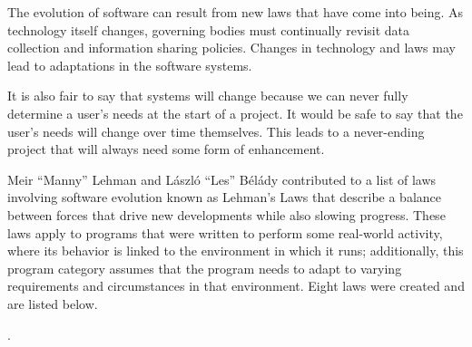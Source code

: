 The evolution of software can result from new laws that have come into being. As technology itself changes, governing bodies must continually revisit data collection and information sharing policies. Changes in technology and laws may lead to adaptations in the software systems.

It is also fair to say that systems will change because we can never fully determine a user's needs at the start of a project. It would be safe to say that the user's needs will change over time themselves. This leads to a never-ending project that will always need some form of enhancement.

Meir ``Manny'' Lehman and László ``Les'' Bélády contributed to a list of laws involving software evolution known as Lehman's Laws that describe a balance between forces that drive new developments while also slowing progress. These laws apply to programs that were written to perform some real-world activity, where its behavior is linked to the environment in which it runs; additionally, this program category assumes that the program needs to adapt to varying requirements and circumstances in that environment. Eight laws were created and are listed below. \cite{wiki:lehmans-laws}

.

